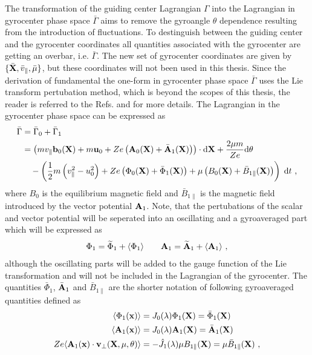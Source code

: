 The transformation of the guiding center Lagrangian $\Gamma$ into the Lagrangian in gyrocenter phase space $\bar{\Gamma}$ aims to remove the gyroangle $\theta$ dependence resulting from the introduction of fluctuations. To destinguish between the guiding center and the gyrocenter coordinates all quantities associated with the gyrocenter are getting an overbar, i.e. $\bar{\Gamma}$.  The new set of gyrocenter coordinates are given by $\{\bar{\boldsymbol{\mathbf{X}}}, \bar{v}_\parallel, \bar{\mu}\}$, but these coordinates will not been used in this thesis. Since the derivation of fundamental the one-form in gyrocenter phase space $\bar{\Gamma}$ uses the Lie transform pertubation method, which is beyond the scopes of this thesis, the reader is referred to the Refs.  and  for more details. The Lagrangian in the gyrocenter phase space can be expressed as
\begin{gather}
    \begin{aligned}
        \bar{\Gamma} &= \bar{\Gamma}_0 + \bar{\Gamma}_1 \\
                     &= \left(mv_\parallel \boldsymbol{\mathbf{b}}_0(\boldsymbol{\mathbf{X}}) + m\boldsymbol{\mathbf{u}}_0 + Ze\left(\boldsymbol{\mathbf{A}}_0(\boldsymbol{\mathbf{X}}) + \bar{\boldsymbol{\mathbf{A}}}_1(\boldsymbol{\mathbf{X}})\right)\right) \cdot \mathrm{d}\boldsymbol{\mathbf{X}} + \frac{2\mu m}{Ze} \mathrm{d}\theta \\
                     &\quad - \left(\frac{1}{2} m \left(v_\parallel^2 - u_0^2 \right) + Ze \left(\Phi_0(\boldsymbol{\mathbf{X}}) + \bar{\Phi}_1(\boldsymbol{\mathbf{X}})\right) + \mu\left(B_0(\boldsymbol{\mathbf{X}}) + \bar{B}_{1\parallel}(\boldsymbol{\mathbf{X}})\right)\right)\;\mathrm{d}t~,
    \end{aligned}
    \label{eq:gyrocenterPertrubationLagrangian}
\end{gather}
where $B_0$ is the equilibrium magnetic field and $\bar{B}_{1\parallel}$ is the magnetic field introduced by the vector potential $\boldsymbol{\mathbf{A}}_1$. Note, that the pertubations of the scalar and vector potential will be seperated into an oscillating and a gyroaveraged part which will be expressed as
\begin{gather}
    \Phi_1 = \widetilde{\Phi}_1 + \langle \Phi_1 \rangle  \qquad \boldsymbol{\mathbf{A}}_1 = \widetilde{\boldsymbol{\mathbf{A}}}_1 + \langle \boldsymbol{\mathbf{A}}_1 \rangle~,
    \label{eq:electromagneticPertubationSeperated}
\end{gather}
although the oscillating parts will be added to the gauge function of the Lie transformation and will not be included in the Lagrangian of the gyrocenter. The quantities $\bar{\Phi}_1$, $\bar{\boldsymbol{\mathbf{A}}}_1$ and $\bar{B}_{1\parallel}$ are the shorter notation of following gyroaveraged quantities defined as
\begin{gather}
    \begin{aligned}
        \langle \Phi_1(\boldsymbol{\mathbf{x}}) \rangle &= J_0(\lambda) \Phi_1(\boldsymbol{\mathbf{X}}) = \bar{\Phi}_1(\boldsymbol{\mathbf{X}}) \\
        \langle \boldsymbol{\mathbf{A}}_1(\boldsymbol{\mathbf{x}})   \rangle &= J_0(\lambda) \boldsymbol{\mathbf{A}}_1(\boldsymbol{\mathbf{X}}) = \bar{\boldsymbol{\mathbf{A}}}_1(\boldsymbol{\mathbf{X}}) \\ 
        Ze \langle \boldsymbol{\mathbf{A}}_1(\boldsymbol{\mathbf{x}}) \cdot \boldsymbol{\mathbf{v}}_\perp (\boldsymbol{\mathbf{X}},\mu,\theta) \rangle &= - \hat{J}_1(\lambda) \mu B_{1 \parallel}(\boldsymbol{\mathbf{X}}) = \mu\bar{B}_{1\parallel}(\boldsymbol{\mathbf{X}})~,
    \end{aligned}
    \label{eq:gyrocenterGyroaveragedQuantitiesFourierspace}
\end{gather}
